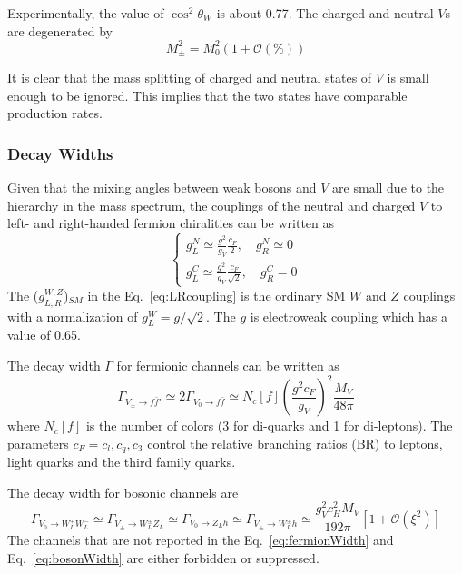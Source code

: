 Experimentally, the value of $\cos^2\theta_W$ is about 0.77. The charged and neutral $V$s are degenerated by
\begin{equation} \label{eq:hvtMass}
  M_\pm^2 = M_0^2 (1+\mathcal{O}(\%))
\end{equation}

It is clear that the mass splitting of charged and neutral states of $V$ is small enough to be ignored. This implies that the two states have comparable production rates.

\subsubsection*{Decay Widths}

Given that the mixing angles between weak bosons and $V$ are small due to the hierarchy in the mass spectrum, the couplings of the neutral and charged $V$ to left- and right-handed fermion chiralities can be written as
\begin{equation} \label{eq:LRcoupling}
  \begin{cases}
    g_L^N \simeq\frac{g^2}{g_V}\frac{c_F}{2}, \quad g_R^N \simeq 0 \\
    g_L^C \simeq\frac{g^2}{g_V}\frac{c_F}{\sqrt{2}}, \quad g_R^C = 0
  \end{cases}
\end{equation}
The ($g_{L,R}^{W,Z}$)$_{SM}$ in the Eq.~\ref{eq:LRcoupling} is the ordinary SM $W$ and $Z$ couplings with a normalization of $g_L^W = g/\sqrt{2}$. The $g$ is electroweak coupling which has a value of 0.65.

The decay width $\Gamma$ for fermionic channels can be written as
\begin{equation} \label{eq:fermionWidth}
  \Gamma_{V_\pm\rightarrow f\bar{f}'} \simeq 2\Gamma_{V_0\rightarrow f\bar{f}} \simeq N_c[f](\frac{g^2c_F}{g_V})^2\frac{M_V}{48\pi}
\end{equation}
where $N_c[f]$ is the number of colors (3 for di-quarks and 1 for di-leptons). The parameters $c_F={c_l,c_q,c_3}$ control the relative branching ratios (BR) to leptons, light quarks and the third family quarks.

The decay width for bosonic channels are
\begin{equation} \label{eq:bosonWidth}
  \Gamma_{V_0\rightarrow W_L^+W_L^-}\simeq\Gamma_{V_\pm\rightarrow W_L^\pm Z_L}\simeq\Gamma_{V_0\rightarrow Z_Lh}\simeq\Gamma_{V_\pm\rightarrow W_L^\pm h}\simeq\frac{g_V^2c_H^2M_V}{192\pi}[1+\mathcal{O}(\xi^2)]
\end{equation}
The channels that are not reported in the Eq.~\ref{eq:fermionWidth} and Eq.~\ref{eq:bosonWidth} are either forbidden or suppressed.

